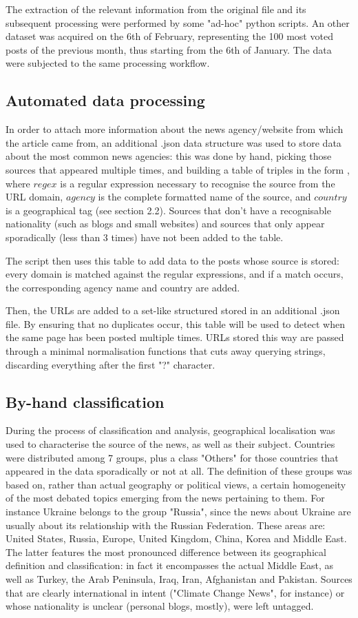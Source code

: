 \documentclass{article}
\begin{document}
The extraction of the relevant information from the original file and its subsequent processing were performed by some "ad-hoc" python scripts.
An other dataset was acquired on the 6th of February, representing the 100 most voted posts of the previous month, thus starting from the 6th of January. The data were subjected to the same processing workflow.
\subsection{Automated data processing} 
In order to attach more information about the news agency/website from which the article came from, an additional .json data structure was used to store data about the most common news agencies: this was done by hand, picking those sources that appeared multiple times, and building a table of triples in the form \(<regex, agency, country>\), where \(regex\) is a regular expression necessary to recognise the source from the URL domain, 
\(agency\) is the complete formatted name of the source, and \(country\) is a geographical tag (see section 2.2). Sources that don't have a recognisable nationality (such as blogs and small websites) and sources that only appear sporadically (less than 3 times) have not been added to the table.

The script then uses this table to add data to the posts whose source is stored: every domain is matched against the regular expressions, and if a match occurs, the corresponding agency name and country are added.

Then, the URLs are added to a set-like structured stored in an additional .json file. By ensuring that no duplicates occur, this table will be used to detect when the same page has been posted multiple times. URLs stored this way are passed through a minimal normalisation functions that cuts away querying strings, discarding everything after the first "?" character.
\subsection{By-hand classification}
During the process of classification and analysis, geographical localisation was used to characterise the source of the news, as well as their subject. Countries were distributed among 7 groups, plus a class "Others" for those countries that appeared in the data sporadically or not at all. The definition of these groups was based on, rather than actual geography or political views, a certain homogeneity of the most debated topics emerging from the news pertaining to them. For instance Ukraine belongs to the group "Russia", since the news about Ukraine are usually about its relationship with the Russian Federation.
These areas are: United States, Russia, Europe, United Kingdom, China, Korea and Middle East. The latter features the most pronounced difference between its geographical definition and classification: in fact it encompasses the actual Middle East, as well as Turkey, the Arab Peninsula, Iraq, Iran, Afghanistan and Pakistan. Sources that are clearly international in intent ("Climate Change News", for instance) or whose nationality is unclear (personal blogs, mostly), were left untagged.
\end{document}
